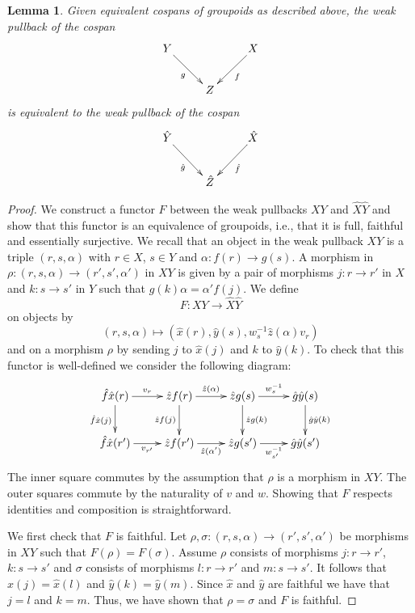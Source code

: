 \documentclass{article}
\renewcommand{\to}{\rightarrow}
\newcommand{\maps}{\colon}
\newtheorem{lemma}[thm]{Lemma}
\begin{document}
\begin{lemma}\label{skeletal}
Given equivalent cospans of groupoids as described above, the weak
pullback of the cospan
\[
\xymatrix{
Y\ar[dr]_{g} & & X\ar[dl]^{f} \\
& Z & 
}
\]
is equivalent to the weak pullback of the cospan
\[
\xymatrix{
\hat{Y}\ar[dr]_{\hat{g}} & & \hat{X}\ar[dl]^{\hat{f}} \\
& \hat{Z} & 
}
\]
\end{lemma}

\begin{proof}
We construct a functor $F$ between the weak
pullbacks $XY$ and $\hat{X}\hat{Y}$ and show that this functor is an
equivalence of groupoids, i.e., that it is full, faithful and
essentially surjective.  We recall that an object in the weak pullback
$XY$ is a triple $(r,s,\alpha)$ with $r\in X$, $s\in Y$ and
$\alpha \maps f(r) \to g(s)$.  A morphism in
$\rho \maps (r,s,\alpha) \to (r',s',\alpha')$ in $XY$ is given by a
pair of morphisms $j \maps r\to r'$ in $X$ and $k\maps s\to s'$ in $Y$
such that $g(k)\alpha = \alpha' f(j)$.  We define
\[F \maps XY \to \hat{X}\hat{Y}\]
on objects by
\[(r,s,\alpha) \mapsto (\hat{x}(r),\hat{y}(s),w_s^{-1}\hat{z}(\alpha)v_r)\]
and on a morphism $\rho$ by sending $j$ to $\hat{x}(j)$ and $k$ to
$\hat{y}(k)$.  To check that this functor is well-defined we consider
the following diagram:
\[
\xymatrix{
\hat{f}\hat{x}(r)\ar[r]^{v_r}\ar[d]_{\hat{f}\hat{x}(j)} & \hat{z}f(r)\ar[r]^{\hat{z}(\alpha)}\ar[d]_{\hat{z}f(j)} & \hat{z}g(s)\ar[r]^{w_s^{-1}}\ar[d]^{\hat{z}g(k)} & \hat{g}\hat{y}(s)\ar[d]^{\hat{g}\hat{y}(k)}\\
\hat{f}\hat{x}(r')\ar[r]_{v_{r'}} & \hat{z}f(r')\ar[r]_{\hat{z}(\alpha')} & \hat{z}g(s')\ar[r]_{w_{s'}^{-1}} & \hat{g}\hat{y}(s')
}
\]
The inner square commutes by the assumption that $\rho$ is a morphism
in $XY$.  The outer squares commute by the naturality of $v$ and $w$.
Showing that $F$ respects identities and composition is
straightforward.

We first check that $F$ is faithful.  Let $\rho,\sigma \maps
(r,s,\alpha) \to (r',s',\alpha')$ be morphisms in $XY$ such that
$F(\rho) = F(\sigma)$.  Assume $\rho$ consists of
morphisms $j\maps r \to r'$, $k\maps s \to s'$ and $\sigma$ consists
of morphisms $l\maps r \to r'$ and $m \maps s \to s'$.  It follows
that $\hat{x}(j) = \hat{x}(l)$ and $\hat{y}(k) = \hat{y}(m)$.  Since
$\hat{x}$ and $\hat{y}$ are faithful we have that $j=l$ and $k=m$.
Thus, we have shown that $\rho = \sigma$ and $F$ is
faithful.


\end{proof}
\end{document}

